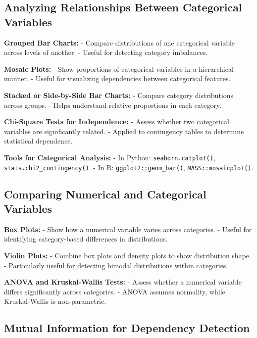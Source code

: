 \documentclass[12pt,openany]{book}
\begin{document}
\subsection{Analyzing Relationships Between Categorical Variables}

\textbf{Grouped Bar Charts:}
- Compare distributions of one categorical variable across levels of another.
- Useful for detecting category imbalances.
\newline

\textbf{Mosaic Plots:}
- Show proportions of categorical variables in a hierarchical manner.
- Useful for visualizing dependencies between categorical features.
\newline

\textbf{Stacked or Side-by-Side Bar Charts:}
- Compare category distributions across groups.
- Helps understand relative proportions in each category.
\newline

\textbf{Chi-Square Tests for Independence:}
- Assess whether two categorical variables are significantly related.
- Applied to contingency tables to determine statistical dependence.
\newline

\textbf{Tools for Categorical Analysis:}
- In Python: \texttt{seaborn.catplot()}, \texttt{stats.chi2\_contingency()}.
- In R: \texttt{ggplot2::geom\_bar()}, \texttt{MASS::mosaicplot()}.
\newline

\subsection{Comparing Numerical and Categorical Variables}

\textbf{Box Plots:}
- Show how a numerical variable varies across categories.
- Useful for identifying category-based differences in distributions.
\newline

\textbf{Violin Plots:}
- Combine box plots and density plots to show distribution shape.
- Particularly useful for detecting bimodal distributions within categories.
\newline

\textbf{ANOVA and Kruskal-Wallis Tests:}
- Assess whether a numerical variable differs significantly across categories.
- ANOVA assumes normality, while Kruskal-Wallis is non-parametric.
\newline

\subsection{Mutual Information for Dependency Detection}
\end{document}
